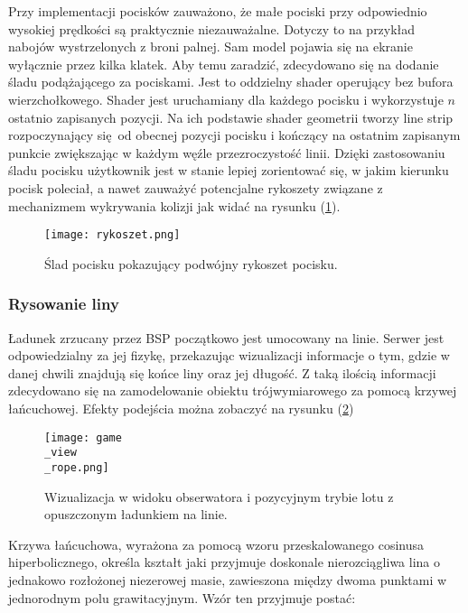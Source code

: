 Przy implementacji pocisków zauważono, że małe pociski przy odpowiednio wysokiej prędkości są praktycznie niezauważalne. Dotyczy to na przykład nabojów wystrzelonych z broni palnej. Sam model pojawia się na ekranie wyłącznie przez kilka klatek. Aby temu zaradzić, zdecydowano się na dodanie śladu podążającego za pociskami. Jest to oddzielny shader operujący bez bufora wierzchołkowego. Shader jest uruchamiany dla każdego pocisku i wykorzystuje $n$ ostatnio zapisanych pozycji. Na ich podstawie shader geometrii tworzy line strip rozpoczynający się od obecnej pozycji pocisku i kończący na ostatnim zapisanym punkcie zwiększając w każdym węźle przezroczystość linii. Dzięki zastosowaniu śladu pocisku użytkownik jest w stanie lepiej zorientować się, w jakim kierunku pocisk poleciał, a nawet zauważyć potencjalne rykoszety związane z mechanizmem wykrywania kolizji jak widać na rysunku (\ref{rykoszet}).

\begin{figure}[h]
	\centering
	\texttt{[image: rykoszet.png]}
	\caption{Ślad pocisku pokazujący podwójny rykoszet pocisku.}
	\label{rykoszet}
\end{figure}

\subsubsection{Rysowanie liny}

Ładunek zrzucany przez BSP początkowo jest umocowany na linie. Serwer jest odpowiedzialny za jej fizykę, przekazując wizualizacji informacje o tym, gdzie w danej chwili znajdują się końce liny oraz jej długość. Z taką ilością informacji zdecydowano się na zamodelowanie obiektu trójwymiarowego za pomocą krzywej łańcuchowej. Efekty podejścia można zobaczyć na rysunku (\ref{gui_game4})
\\

\begin{figure}[!h]
	\centering
	\texttt{[image: game\\\_view\\\_rope.png]}
	\caption{Wizualizacja w widoku obserwatora i pozycyjnym trybie lotu z opuszczonym ładunkiem na linie.}
	\label{gui_game4}
\end{figure}

Krzywa łańcuchowa, wyrażona za pomocą wzoru przeskalowanego cosinusa hiperbolicznego, określa kształt jaki przyjmuje doskonale nierozciągliwa lina o jednakowo rozłożonej niezerowej masie, zawieszona między dwoma punktami w jednorodnym polu grawitacyjnym. Wzór ten przyjmuje postać:


